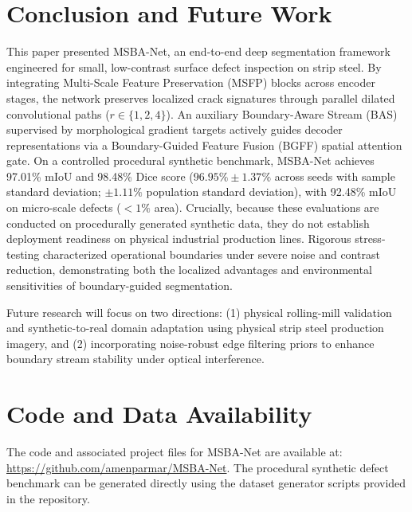 \documentclass{ieeeaccess}
\begin{document}
\section{Conclusion and Future Work}
\label{sec:conclusion_future}
This paper presented MSBA-Net, an end-to-end deep segmentation framework engineered for small, low-contrast surface defect inspection on strip steel. By integrating Multi-Scale Feature Preservation (MSFP) blocks across encoder stages, the network preserves localized crack signatures through parallel dilated convolutional paths ($r \in \{1, 2, 4\}$). An auxiliary Boundary-Aware Stream (BAS) supervised by morphological gradient targets actively guides decoder representations via a Boundary-Guided Feature Fusion (BGFF) spatial attention gate. On a controlled procedural synthetic benchmark, MSBA-Net achieves 97.01\% mIoU and 98.48\% Dice score ($96.95\% \pm 1.37\%$ across seeds with sample standard deviation; $\pm 1.11\%$ population standard deviation), with 92.48\% mIoU on micro-scale defects ($<1\%$ area). Crucially, because these evaluations are conducted on procedurally generated synthetic data, they do not establish deployment readiness on physical industrial production lines. Rigorous stress-testing characterized operational boundaries under severe noise and contrast reduction, demonstrating both the localized advantages and environmental sensitivities of boundary-guided segmentation.

Future research will focus on two directions: (1) physical rolling-mill validation and synthetic-to-real domain adaptation using physical strip steel production imagery, and (2) incorporating noise-robust edge filtering priors to enhance boundary stream stability under optical interference.

\section*{Code and Data Availability}
The code and associated project files for MSBA-Net are available at: \url{https://github.com/amenparmar/MSBA-Net}. The procedural synthetic defect benchmark can be generated directly using the dataset generator scripts provided in the repository.




\EOD
\end{document}
